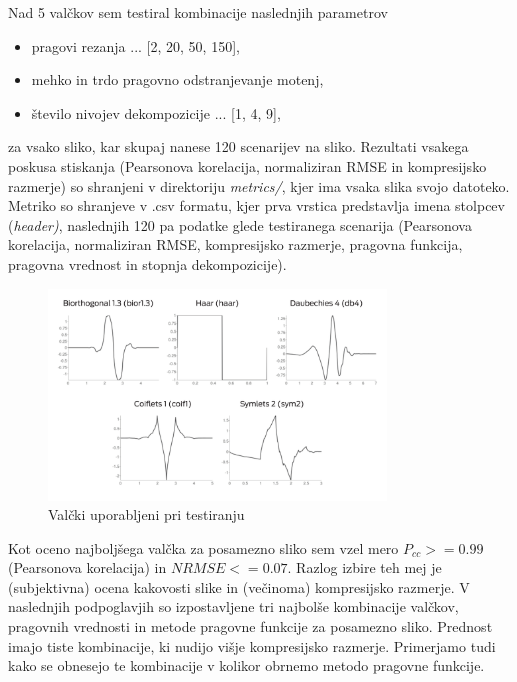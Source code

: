 \documentclass[a4paper,11pt]{article}
\begin{document}
Nad 5 valčkov sem testiral kombinacije naslednjih parametrov
\begin{itemize}
	\item pragovi rezanja ... [2, 20, 50, 150],
    \item mehko in trdo pragovno odstranjevanje motenj,
    \item število nivojev dekompozicije ... [1, 4, 9],
\end{itemize}
za vsako sliko, kar skupaj nanese 120 scenarijev na sliko. Rezultati vsakega poskusa stiskanja (Pearsonova korelacija, normaliziran RMSE in kompresijsko razmerje) so shranjeni v direktoriju \textit{metrics/}, kjer ima vsaka slika svojo datoteko. Metriko so shranjeve v .csv formatu, kjer prva vrstica predstavlja imena stolpcev (\textit{header)}, naslednjih 120 pa podatke glede testiranega scenarija (Pearsonova korelacija, normaliziran RMSE, kompresijsko razmerje, pragovna funkcija, pragovna vrednost in stopnja dekompozicije).

\begin{figure}[htbp]
\begin{center}
\includegraphics[width=0.8\textwidth]{images/report/wavelets.pdf}
\caption{Valčki uporabljeni pri testiranju}
\label{wavelets}
\end{center}
\end{figure}

Kot oceno najboljšega valčka za posamezno sliko sem vzel mero $P_{cc} >=0.99$ (Pearsonova korelacija) in $NRMSE <=0.07$. Razlog izbire teh mej je (subjektivna) ocena kakovosti slike in (večinoma) kompresijsko razmerje. V naslednjih podpoglavjih so izpostavljene tri najbolše kombinacije valčkov, pragovnih vrednosti in metode pragovne funkcije za posamezno sliko. Prednost imajo tiste kombinacije, ki nudijo višje kompresijsko razmerje. Primerjamo tudi kako se obnesejo te kombinacije v kolikor obrnemo metodo pragovne funkcije.
\end{document}

